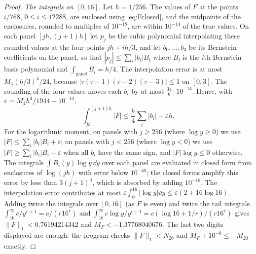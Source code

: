 \documentclass[11pt,colorlinks]{charlie}
\begin{document}
\begin{proof}
\emph{The integrals on $[0,16]$.} Let $h=1/256$. The values of $F$ at the points $i/768$, $0\le i\le12288$, are enclosed using \eqref{eq:Fclosed}, and the midpoints of the enclosures, rounded to multiples of $10^{-18}$, are within $10^{-14}$ of the true values. On each panel $[jh,(j+1)h]$ let $p_j$ be the cubic polynomial interpolating these rounded values at the four points $jh+ih/3$, and let $b_0,\dots,b_3$ be its Bernstein coefficients on the panel, so that $|p_j|\le\sum_i|b_i|B_i$ where $B_i$ is the $i$th Bernstein basis polynomial and $\int_{\text{panel}}B_i=h/4$. The interpolation error is at most $M_4(h/3)^4/24$, because $|\tau(\tau-1)(\tau-2)(\tau-3)|\le1$ on $[0,3]$. The rounding of the four values moves each $b_i$ by at most $\frac{34}6\cdot10^{-14}$. Hence, with $\varepsilon=M_4h^4/1944+10^{-13}$,
\[
 \int_{jh}^{(j+1)h}|F|\le\frac h4\sum_i|b_i|+\varepsilon h .
\]
For the logarithmic moment, on panels with $j\ge256$ (where $\log y\ge0$) we use $|F|\le\sum_i|b_i|B_i+\varepsilon$; on panels with $j<256$ (where $\log y<0$) we use $|F|\ge\sum_i|b_i|B_i-\varepsilon$ when all $b_i$ have the same sign, and $|F|\log y\le0$ otherwise. The integrals $\int B_i(y)\log y\,\dd y$ over each panel are evaluated in closed form from enclosures of $\log(jh)$ with error below $10^{-40}$; the closed forms amplify this error by less than $3(j+1)^4$, which is absorbed by adding $10^{-18}$. The interpolation error contributes at most $\varepsilon\int_0^{16}|\log y|\dd y\le\varepsilon(2+16\log16)$. Adding twice the integrals over $[0,16]$ (as $F$ is even) and twice the tail integrals $\int_{16}^\infty c/y^{r+1}=c/(r16^r)$ and $\int_{16}^\infty c\log y/y^{r+1}=c(\log16+1/r)/(r16^r)$ gives $\|F\|_1<0.76194214342$ and $M_F<-1.37768040676$. The last two digits displayed are enough: the program checks $\|F\|_1<N_{20}$ and $M_F+10^{-8}\le-M_{20}$ exactly.
\end{proof}
\end{document}
